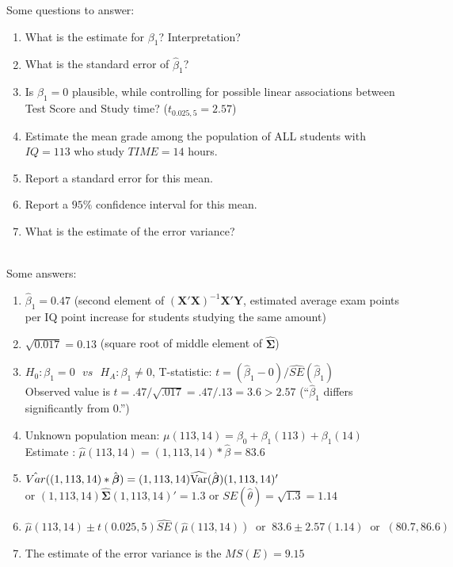 \documentclass{report}
\begin{document}
Some questions to answer:
\begin{enumerate}
\item What is the estimate for $\beta_1$?  Interpretation? 
\item What is the standard error of $\hat\beta_1$?  
\item Is $\beta_1=0$ plausible, while controlling for possible linear associations between Test Score and Study time? ($t_{0.025,5}=2.57$) 
\item Estimate the mean grade among the population of ALL students with $IQ=113$ who study $TIME=14$ hours.
\item Report a standard error for this mean.
\item Report a $95\%$ confidence interval for this mean.
\item What is the estimate of the error variance?
\end{enumerate}
~\\
Some answers:
\begin{enumerate}
\item $\hat\beta_1 =0.47$ (second element of $(\textbf{X}'\textbf{X})^{-1} \textbf{X}'\textbf{Y}$, estimated average exam points per IQ point increase for students studying the same amount)
\item $\sqrt{0.017}=0.13$ (square root of middle element of $\widehat{\boldsymbol{\Sigma}}$)
\item $H_0: \beta_1=0~~~vs ~~~H_A:\beta_1\neq 0$, T-statistic: $t=(\hat\beta_1 - 0)/\hat{SE}(\hat\beta_1)$ \\
Observed value is $t=.47/\sqrt{.017} = .47/.13=3.6 > 2.57$ (``$\hat\beta_1$ differs significantly from 0.'')
\item Unknown population mean: $\mu(113,14)=\beta_0+\beta_1(113) +\beta_1(14)$ \\
Estimate : $\hat\mu(113,14)=(1,113,14)* \hat\beta = 83.6$
\item $\hat{Var}((1,113,14) * \hat{\boldsymbol{\beta}}) = (1,113,14)\widehat{\mbox{Var}}(\hat{\boldsymbol{\beta}}) (1,113,14)'$\\
or $(1,113,14)\widehat{\boldsymbol{\Sigma}} (1,113,14)'=1.3$ or $SE(\hat\theta) = \sqrt{1.3}=1.14$
\item $\hat\mu(113,14) \pm t(0.025,5) \hat{SE}(\hat\mu(113,14)) \ \mbox{ or } \ 83.6 \pm { 2.57} (1.14) \ \mbox{ or } \ (80.7, 86.6)$
\item The estimate of the error variance is the $MS(E)=9.15$
\end{enumerate}
\end{document}
